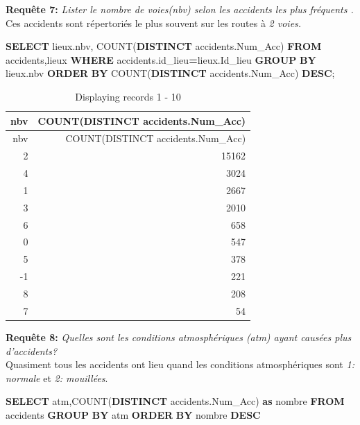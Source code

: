\documentclass[mstat,12pt]{unswthesis}
\newenvironment{Shaded}{\begin{snugshade}}{\end{snugshade}}
\newcommand{\FunctionTok}[1]{\textcolor[rgb]{0.00,0.00,0.00}{#1}}
\newcommand{\KeywordTok}[1]{\textcolor[rgb]{0.13,0.29,0.53}{\textbf{#1}}}
\newcommand{\NormalTok}[1]{#1}
\newcommand{\OperatorTok}[1]{\textcolor[rgb]{0.81,0.36,0.00}{\textbf{#1}}}
\begin{document}
\medskip

\textbf{Requête 7:} \emph{Lister le nombre de voies(nbv) selon les
accidents les plus fréquents .}\\
Ces accidents sont répertoriés le plus souvent sur les routes à \emph{2
voies.}

\begin{Shaded}
\begin{Highlighting}[]
\KeywordTok{SELECT}\NormalTok{ lieux.nbv, }\FunctionTok{COUNT}\NormalTok{(}\KeywordTok{DISTINCT}\NormalTok{ accidents.Num\_Acc) }
\KeywordTok{FROM}\NormalTok{ accidents,lieux }
\KeywordTok{WHERE}\NormalTok{ accidents.id\_lieu}\OperatorTok{=}\NormalTok{lieux.Id\_lieu }
\KeywordTok{GROUP} \KeywordTok{BY}\NormalTok{ lieux.nbv }
\KeywordTok{ORDER} \KeywordTok{BY}\NormalTok{ \textasciigrave{}COUNT(}\KeywordTok{DISTINCT}\NormalTok{ accidents.Num\_Acc)\textasciigrave{} }\KeywordTok{DESC}\NormalTok{;}
\end{Highlighting}
\end{Shaded}

\begin{longtable}[]{@{}rr@{}}
\caption{Displaying records 1 - 10}\tabularnewline
\toprule()
nbv & COUNT(DISTINCT accidents.Num\_Acc) \\
\midrule()
\endfirsthead
\toprule()
nbv & COUNT(DISTINCT accidents.Num\_Acc) \\
\midrule()
\endhead
2 & 15162 \\
4 & 3024 \\
1 & 2667 \\
3 & 2010 \\
6 & 658 \\
0 & 547 \\
5 & 378 \\
-1 & 221 \\
8 & 208 \\
7 & 54 \\
\bottomrule()
\end{longtable}

\medskip

\textbf{Requête 8:} \emph{Quelles sont les conditions atmosphériques
(atm) ayant causées plus d'accidents?}\\
Quasiment tous les accidents ont lieu quand les conditions
atmosphériques sont \emph{1: normale} et \emph{2: mouillées}.

\begin{Shaded}
\begin{Highlighting}[]
\KeywordTok{SELECT}\NormalTok{ atm,}\FunctionTok{COUNT}\NormalTok{(}\KeywordTok{DISTINCT}\NormalTok{ accidents.Num\_Acc) }\KeywordTok{as}\NormalTok{ nombre}
\KeywordTok{FROM}\NormalTok{ accidents}
\KeywordTok{GROUP} \KeywordTok{BY}\NormalTok{ atm}
\KeywordTok{ORDER} \KeywordTok{BY}\NormalTok{ nombre }\KeywordTok{DESC}
\end{Highlighting}
\end{Shaded}
\end{document}
